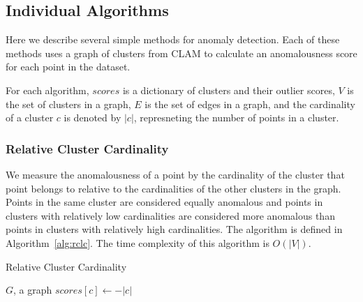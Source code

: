 \subsection{Individual Algorithms}\label{subsec:methods:individual-algorithms}

Here we describe several simple methods for anomaly detection.
Each of these methods uses a graph of clusters from CLAM to calculate an anomalousness score for each point in the dataset.

For each algorithm, $scores$ is a dictionary of clusters and their outlier scores,
$V$ is the set of clusters in a graph,
$E$ is the set of edges in a graph, and
the cardinality of a cluster $c$ is denoted by $|c|$, represneting the number of points in a cluster.

\subsubsection{Relative Cluster Cardinality}
We measure the anomalousness of a point by the cardinality of the cluster that point belongs to relative to the cardinalities of the other clusters in the graph.
Points in the same cluster are considered equally anomalous and points in clusters with relatively low cardinalities are considered more anomalous than points in clusters with relatively high cardinalities. The algorithm is defined in Algorithm~\ref{alg:rclc}. The time complexity of this algorithm is $O(|V|)$.



\begin{algorithm}[h]
    \caption{Relative Cluster Cardinality}
    \label{alg:rclc}
\begin{algorithmic}[1]
    \REQUIRE $G$, a graph
    \STATE $scores[c] \gets -|c|$
    \ENDFOR
\end{algorithmic}
\end{algorithm}

